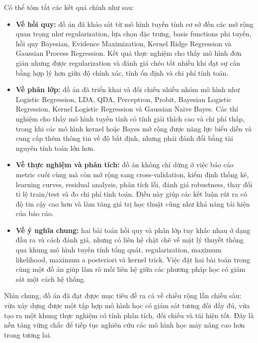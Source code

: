 Có thể tóm tắt các kết quả chính như sau:
\begin{itemize}[labelsep=10pt, leftmargin=1.8cm]
    \item \textbf{Về hồi quy:} đồ án đã khảo sát từ mô hình tuyến tính cơ sở đến các mở rộng quan trọng như regularization, lựa chọn đặc trưng, basis functions phi tuyến, hồi quy Bayesian, Evidence Maximization, Kernel Ridge Regression và Gaussian Process Regression. Kết quả thực nghiệm cho thấy mô hình đơn giản nhưng được regularization và đánh giá chéo tốt nhiều khi đạt sự cân bằng hợp lý hơn giữa độ chính xác, tính ổn định và chi phí tính toán.

    \item \textbf{Về phân lớp:} đồ án đã triển khai và đối chiếu nhiều nhóm mô hình như Logistic Regression, LDA, QDA, Perceptron, Probit, Bayesian Logistic Regression, Kernel Logistic Regression và Gaussian Naive Bayes. Các thí nghiệm cho thấy mô hình tuyến tính có tính giải thích cao và chi phí thấp, trong khi các mô hình kernel hoặc Bayes mở rộng được năng lực biểu diễn và cung cấp thêm thông tin về độ bất định, nhưng phải đánh đổi bằng tài nguyên tính toán lớn hơn.

    \item \textbf{Về thực nghiệm và phân tích:} đồ án không chỉ dừng ở việc báo cáo metric cuối cùng mà còn mở rộng sang cross-validation, kiểm định thống kê, learning curves, residual analysis, phân tích lỗi, đánh giá robustness, thay đổi tỉ lệ train/test và đo chi phí tính toán. Điều này giúp các kết luận rút ra có độ tin cậy cao hơn và làm tăng giá trị học thuật cũng như khả năng tái hiện của báo cáo.

    \item \textbf{Về ý nghĩa chung:} hai bài toán hồi quy và phân lớp tuy khác nhau ở dạng đầu ra và cách đánh giá, nhưng có liên hệ chặt chẽ về mặt lý thuyết thông qua khung mô hình tuyến tính tổng quát, regularization, maximum likelihood, maximum a posteriori và kernel trick. Việc đặt hai bài toán trong cùng một đồ án giúp làm rõ mối liên hệ giữa các phương pháp học có giám sát một cách hệ thống.
\end{itemize}

Nhìn chung, đồ án đã đạt được mục tiêu đề ra cả về chiều rộng lẫn chiều sâu: vừa xây dựng được một tập hợp mô hình học có giám sát tương đối đầy đủ, vừa tạo ra một khung thực nghiệm có tính phân tích, đối chiếu và tái hiện tốt. Đây là nền tảng vững chắc để tiếp tục nghiên cứu các mô hình học máy nâng cao hơn trong tương lai.

